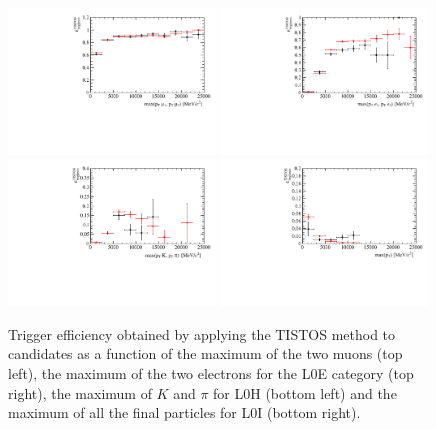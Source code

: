 \begin{figure}[h!]
\centering
\includegraphics[width=0.49\textwidth]{RKst/figs/Efficiencies/efficiencyTisTos_MM.pdf}
\includegraphics[width=0.49\textwidth]{RKst/figs/Efficiencies/efficiencyTisTos_EE_L0E.pdf}
\includegraphics[width=0.49\textwidth]{RKst/figs/Efficiencies/efficiencyTisTos_EE_L0H.pdf}
\includegraphics[width=0.49\textwidth]{RKst/figs/Efficiencies/efficiencyTisTos_EE_L0I.pdf}
\caption{Trigger efficiency obtained by applying the TISTOS method to \mbox{\BdToKstJPsll} candidates
as a function of the maximum \pt of the two muons (top left), the maximum \pt of the two electrons for the L0E category (top right), 
the maximum \pt of $K$ and $\pi$ for L0H (bottom left) and the maximum \pt of all the final particles for L0I (bottom right).}
\label{fig:tistos_vs_pt}
\end{figure}



